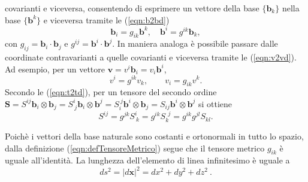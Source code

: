  covarianti e viceversa, consentendo di esprimere un vettore della base $\{ \bm{b}_k \}$ nella base $\{ \bm{b}^k \}$ e viceversa tramite le (\ref{eqn:b2bd})
 \begin{equation}
\bm{b}_i = g_{ik} \bm{b}^k , \quad \bm{b}^i = g^{ik} \bm{b}_k ,
 \end{equation}
 con $g_{ij} = \bm{b}_i \cdot \bm{b}_j$ e $g^{ij} = \bm{b}^i \cdot \bm{b}^j$. In maniera analoga è possibile passare dalle coordinate contravarianti a quelle covarianti e viceversa tramite le (\ref{eqn:v2vd}). Ad esempio, per un vettore $\bm{v} = v^i \bm{b}_i = v_i \bm{b}^i$, 
 \begin{equation}
  v^i = g^{ik} v_k , \qquad v_i = g_{ik} v^k .
 \end{equation}
 Secondo le (\ref{eqn:t2td}), per un tensore del secondo ordine $\bm{S}= S^{ij} \bm{b}_i \otimes \bm{b}_j = 
    S^{i\ }_{\ j} \bm{b}_i \otimes \bm{b}^j =
    S^{\ j}_{i\ } \bm{b}^i \otimes \bm{b}_j = 
    S_{ij} \bm{b}^i \otimes \bm{b}^j$ si ottiene
 \begin{equation}
  S^{ij} = g^{jk} S^{i\ }_{\ k} = g^{ik} S^{\ \ j}_{k\ } = g^{ik} g^{jl} S_{kl} .
 \end{equation}
%
\begin{example}
    Poichè i vettori della base naturale sono costanti e ortonormali in tutto lo spazio, dalla definizione (\ref{eqn:defTensoreMetrico}) segue che il tensore metrico $g_{ik}$ è uguale all'identità.
 La lunghezza dell'elemento di linea infinitesimo è uguale a
\begin{equation}
    ds^2 = |d\bm{x}|^2 = dx^2 + dy^2 + dz^2 \ .
\end{equation}
\end{example}
%
